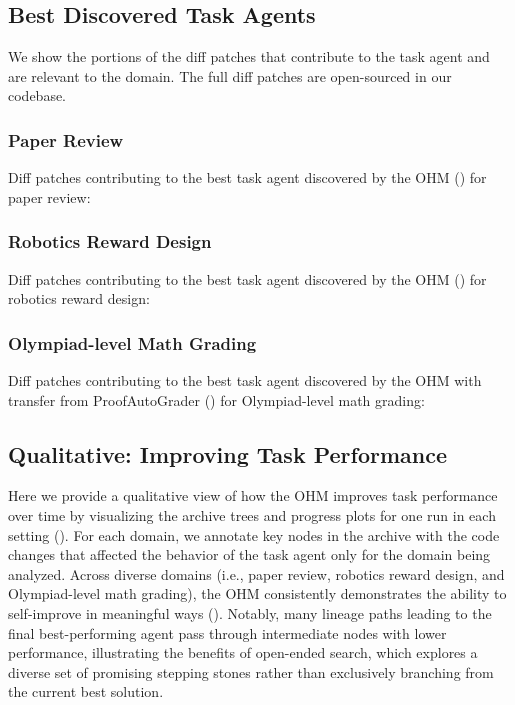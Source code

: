 \documentclass[]{fairmeta}
\begin{document}
\subsection{Best Discovered Task Agents}
\label{app:best-agents}

We show the portions of the diff patches that contribute to the task agent and are relevant to the domain. The full diff patches are open-sourced in our codebase.

\subsubsection{Paper Review}
\label{app:best-agents-paperreview}
Diff patches contributing to the best task agent discovered by the OHM () for paper review:


\subsubsection{Robotics Reward Design}
\label{app:best-agents-genesis}
Diff patches contributing to the best task agent discovered by the OHM () for robotics reward design:


\subsubsection{Olympiad-level Math Grading}
\label{app:best-agents-imograding}
Diff patches contributing to the best task agent discovered by the OHM with transfer from ProofAutoGrader () for Olympiad-level math grading:


\subsection{Qualitative: Improving Task Performance}
\label{app:qual-task}

Here we provide a qualitative view of how the OHM improves task performance over time by visualizing the archive trees and progress plots for one run in each setting (). For each domain, we annotate key nodes in the archive with the code changes that affected the behavior of the task agent only for the domain being analyzed. Across diverse domains (i.e., paper review, robotics reward design, and Olympiad-level math grading), the OHM consistently demonstrates the ability to self-improve in meaningful ways (). Notably, many lineage paths leading to the final best-performing agent pass through intermediate nodes with lower performance, illustrating the benefits of open-ended search, which explores a diverse set of promising stepping stones rather than exclusively branching from the current best solution.
\end{document}
